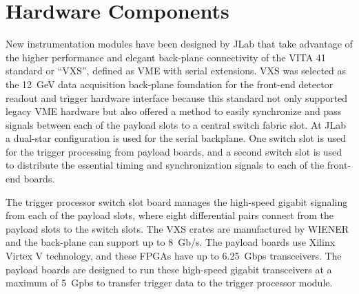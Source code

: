 \section{Hardware Components}

New instrumentation modules have been designed by JLab that take advantage of the higher performance and elegant back-plane connectivity of the VITA 41 standard or ``VXS'', defined as VME with serial extensions. 
VXS was selected as the 12~GeV data acquisition back-plane foundation for the front-end detector readout and trigger hardware interface because this standard not only supported legacy VME hardware but also offered a method to easily synchronize and pass signals between each of the payload slots to a central switch fabric slot. At JLab a dual-star configuration is used for the serial backplane. One switch slot is used for the trigger processing from payload boards, and a second switch slot is used to distribute the essential timing and synchronization signals to each of the front-end boards.

The trigger processor switch slot board manages the high-speed gigabit signaling from each of the payload slots, where eight differential pairs connect from the payload slots to the switch slots. The VXS crates are manufactured by WIENER and the back-plane can support up to 8~Gb/s. The payload boards use Xilinx Virtex V technology, and these FPGAs have up to 6.25~Gbps transceivers. The payload boards are designed to run these high-speed gigabit transceivers at a maximum of 5~Gpbs to transfer trigger data to the trigger processor module. 

